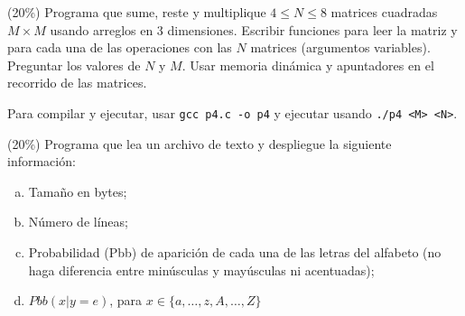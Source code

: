 \documentclass{article}
\theoremstyle{problemstyle}
\begin{document}
\begin{problem}
(20\%) Programa que sume, reste y multiplique $4 \leq N \leq 8$ matrices cuadradas $ M\times M $ usando arreglos en 3 dimensiones. Escribir funciones para leer la matriz y para cada una de las operaciones con las $ N $ matrices (argumentos variables). Preguntar los valores de $ N $ y $ M $. Usar memoria din\'amica y apuntadores en el recorrido de las matrices.


Para compilar y ejecutar, usar \texttt{gcc p4.c -o p4} y ejecutar usando \texttt{./p4 <M> <N>}.
\end{problem}

\begin{problem}
(20\%) Programa que lea un archivo de texto y despliegue la siguiente información:
\begin{enumerate}[a.]
	\item Tama\~no en bytes;
	\item N\'umero de l\'ineas;
	\item Probabilidad (Pbb) de aparici\'on de cada una de las letras del alfabeto (no haga diferencia entre min\'usculas y may\'usculas ni acentuadas);
	\item $Pbb(x|y=e)$, para $ x\in \{a,\dots, z, A, \dots, Z\} $



\end{enumerate}
\end{problem}
\end{document}
